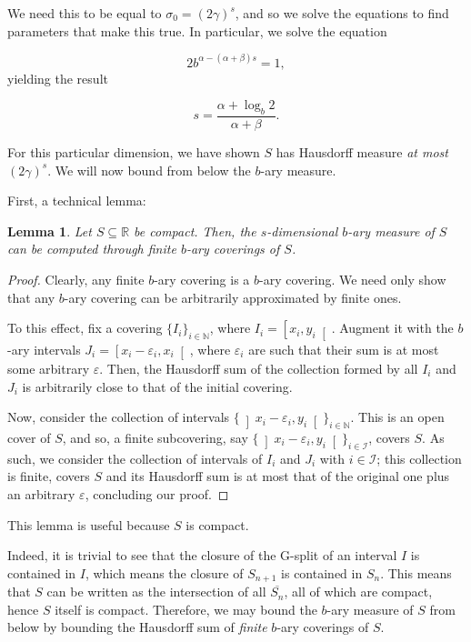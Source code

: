 \documentclass[11pt, reqno]{amsart}
\newcommand{\R}{\mathbb{R}}
\newcommand{\N}{\mathbb{N}}
\newtheorem{lemma}{Lemma}
\begin{document}
We need this to be equal to $\sigma_0 = (2 \gamma)^s$, and so we solve the equations to find parameters that make this true. In particular, we solve the equation

\[ 2 b^{\alpha - (\alpha + \beta) s} = 1,\]
yielding the result

\[s = \frac{\alpha + \log_b 2}{\alpha + \beta}.\]

For this particular dimension, we have shown $S$ has Hausdorff measure \emph{at most} $(2 \gamma)^s$. We will now bound from below the $b$-ary measure.

First, a technical lemma:

\begin{lemma}
Let $S \subseteq \R$ be compact. Then, the $s$-dimensional $b$-ary measure of $S$ can be computed through finite $b$-ary coverings of $S$.
\end{lemma}

\begin{proof}
Clearly, any finite $b$-ary covering is a $b$-ary covering. We need only show that any $b$-ary covering can be arbitrarily approximated by finite ones.

To this effect, fix a covering $\{ I_i \}_{i \in \N}$, where $I_i = \left[x_i, y_i \right[$. Augment it with the $b$-ary intervals $J_i = \left[x_i - \varepsilon_i, x_i \right[$, where $\varepsilon_i$ are such that their sum is at most some arbitrary $\varepsilon$. Then, the Hausdorff sum of the collection formed by all $I_i$ and $J_i$ is arbitrarily close to that of the initial covering.

Now, consider the collection of intervals $\{ \left]x_i - \varepsilon_i, y_i \right[ \}_{i \in \N}$. This is an open cover of $S$, and so, a finite subcovering, say $\{ \left]x_i - \varepsilon_i, y_i \right[ \}_{i \in \mathcal{I}}$, covers $S$. As such, we consider the collection of intervals of $I_i$ and $J_i$ with $i \in \mathcal{I}$; this collection is finite, covers $S$ and its Hausdorff sum is at most that of the original one plus an arbitrary $\varepsilon$, concluding our proof.
\end{proof}

This lemma is useful because $S$ is compact.

Indeed, it is trivial to see that the closure of the G-split of an interval $I$ is contained in $I$, which means the closure of $S_{n+1}$ is contained in $S_n$. This means that $S$ can be written as the intersection of all $\overline{S_n}$, all of which are compact, hence $S$ itself is compact. Therefore, we may bound the $b$-ary measure of $S$ from below by bounding the Hausdorff sum of \emph{finite} $b$-ary coverings of $S$.
\end{document}
